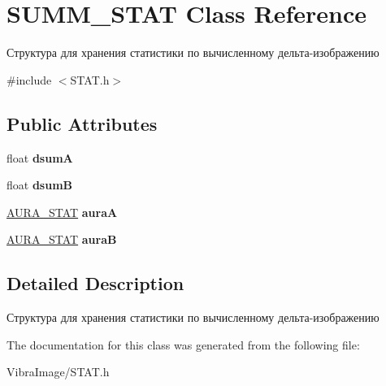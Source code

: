 \hypertarget{class_s_u_m_m___s_t_a_t}{\section{S\+U\+M\+M\+\_\+\+S\+T\+A\+T Class Reference}
\label{class_s_u_m_m___s_t_a_t}
}


Структура для хранения статистики по вычисленному дельта-\/изображению  




{\ttfamily \#include $<$S\+T\+A\+T.\+h$>$}

\subsection*{Public Attributes}
\begin{DoxyCompactItemize}
\item 
\hypertarget{class_s_u_m_m___s_t_a_t_afc39513fb57523e6b0f5031e0b028bb2}{float {\bfseries dsum\+A}}\label{class_s_u_m_m___s_t_a_t_afc39513fb57523e6b0f5031e0b028bb2}

\item 
\hypertarget{class_s_u_m_m___s_t_a_t_ac9723fe5df3465505a22fa8eb259bccd}{float {\bfseries dsum\+B}}\label{class_s_u_m_m___s_t_a_t_ac9723fe5df3465505a22fa8eb259bccd}

\item 
\hypertarget{class_s_u_m_m___s_t_a_t_a404b5e8880976ff65e8db9825063248b}{\hyperlink{class_a_u_r_a___s_t_a_t}{A\+U\+R\+A\+\_\+\+S\+T\+A\+T} {\bfseries aura\+A}}\label{class_s_u_m_m___s_t_a_t_a404b5e8880976ff65e8db9825063248b}

\item 
\hypertarget{class_s_u_m_m___s_t_a_t_aa4bd77e99f011e0c72809be3644521d5}{\hyperlink{class_a_u_r_a___s_t_a_t}{A\+U\+R\+A\+\_\+\+S\+T\+A\+T} {\bfseries aura\+B}}\label{class_s_u_m_m___s_t_a_t_aa4bd77e99f011e0c72809be3644521d5}

\end{DoxyCompactItemize}


\subsection{Detailed Description}
Структура для хранения статистики по вычисленному дельта-\/изображению 



The documentation for this class was generated from the following file\+:\begin{DoxyCompactItemize}
\item 
Vibra\+Image/S\+T\+A\+T.\+h\end{DoxyCompactItemize}
